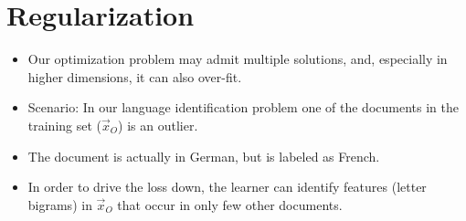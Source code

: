 \section{Regularization}
\begin{itemize}
 \item Our optimization problem may admit multiple solutions, and, especially in higher dimensions, it can also over-fit.
 \item Scenario: In our language identification problem one of the documents in the training set ($\vec{x}_O$) is an outlier.
 \item The document is actually in German, but is labeled as French.
 
 \item In order to drive the loss down, the learner can identify features (letter bigrams) in $\vec{x}_O$ that occur in only few other documents.
 

\end{itemize}
